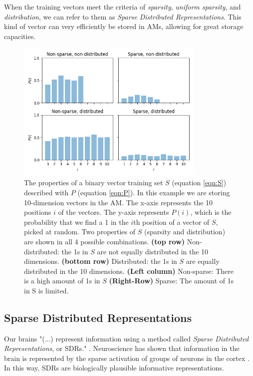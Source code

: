 \documentclass{article}
\begin{document}
When the training vectors meet the criteria of \textit{sparsity}, \textit{uniform sparsity}, and \textit{distribution}, we can refer to them as \textit{Sparse Distributed Representations}. This kind of vector can very efficiently be stored in AMs, allowing for great storage capacities.

\begin{figure}[h]
    \centering
    \includegraphics[width=0.8\textwidth]{img/sparse.png}
    \caption{The properties of a binary vector training set $S$ (equation \ref{eqn:S}) described with $P$ (equation \ref{eqn:P}). In this example we are storing 10-dimension vectors in the AM. The x-axis represents the 10 positions $i$ of the vectors. The y-axis represents $P(i)$, which is the probability that we find a 1 in the $i$th position of a vector of $S$, picked at random. Two properties of $S$ (sparsity and distribution) are shown in all 4 possible combinations. \textbf{(top row)} Non-distributed: the 1s in $S$ are not equally distributed in the 10 dimensions. \textbf{(bottom row)} Distributed: the 1s in $S$ are equally distributed in the 10 dimensions. \textbf{(Left column)} Non-sparse: There is a high amount of 1s in $S$ \textbf{(Right-Row)} Sparse: The amount of 1s in S is limited.}
    \label{fig:mesh1}
\label{fig:sparse}
\end{figure}
\subsection{Sparse Distributed Representations}
Our brains "(...) represent information using a method called \textit{Sparse Distributed Representations}, or SDRs." \cite{Hawkins-et-al-2016-Book}. Neuroscience has shown that information in the brain is represented by the sparse activation of groups of neurons in the cortex \cite{olshausen1996emergence}. In this way, SDRs are biologically plausible informative representations.
\end{document}
